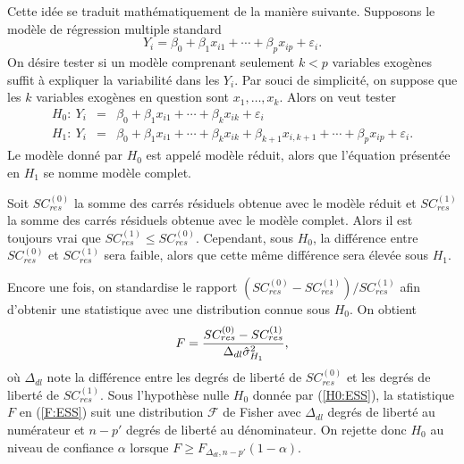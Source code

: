 
Cette idée se traduit mathématiquement de la manière suivante. Supposons le modèle de régression
multiple standard
$$Y_i=\beta_0+\beta_1x_{i1}+\cdots+\beta_{p}x_{ip}+\varepsilon_i.$$
On désire tester si un modèle comprenant seulement $k<p$ variables exogènes
suffit à expliquer la variabilité dans les $Y_i$. Par souci de simplicité, on suppose que les $k$ variables exog\`enes en question sont $x_1,\ldots,x_k$. Alors on veut tester
\begin{eqnarray}
H_0:~Y_i&=&\beta_0+\beta_1x_{i1}+\cdots+\beta_kx_{ik}+\varepsilon_i\label{H0:ESS}\\
H_1:~Y_i&=&\beta_0+\beta_1x_{i1}+\cdots+\beta_kx_{ik}+\beta_{k+1}x_{i,k+1}+\cdots+\beta_{p}x_{ip}
+\varepsilon_i.\nonumber
\end{eqnarray}
Le mod\`ele donné par $H_0$ est appelé mod\`ele réduit, alors que l'équation présentée
en $H_1$ se nomme mod\`ele complet.

Soit $SC_{res}^{(0)}$ la somme des carrés résiduels obtenue avec
le modèle réduit et $SC_{res}^{(1)}$ la somme des carrés résiduels obtenue avec le
modèle complet. Alors il est toujours vrai que $SC_{res}^{(1)}\le SC_{res}^{(0)}$. Cependant, sous $H_0$,
la différence entre $SC_{res}^{(0)}$ et $SC_{res}^{(1)}$ sera faible, alors que cette même
différence sera élevée sous $H_1$.

Encore une fois, on standardise le rapport
$(SC_{res}^{(0)}-SC_{res}^{(1)})/SC_{res}^{(1)}$ afin d'obtenir une statistique avec une distribution connue sous $H_0$. On obtient
\begin{equation}\label{F:ESS}
F={SC_{res}^{(0)}-SC_{res}^{(1)}\over
\Delta_{dl}\hat\sigma^2_{H_1}},
\end{equation}
où $\Delta_{dl}$ note la différence entre les degrés de liberté de
$SC_{res}^{(0)}$ et les degrés de liberté de $SC_{res}^{(1)}$. Sous l'hypothèse nulle $H_0$ donnée par
(\ref{H0:ESS}), la statistique $F$ en (\ref{F:ESS}) suit une distribution $\mathcal F$ de Fisher avec $\Delta_{dl}$ degrés de
liberté au numérateur et $n-p'$ degrés de liberté au dénominateur. On rejette donc $H_0$ au
niveau de confiance $\alpha$ lorsque $F\ge F_{\Delta_{dl},n-p'}(1-\alpha)$.

